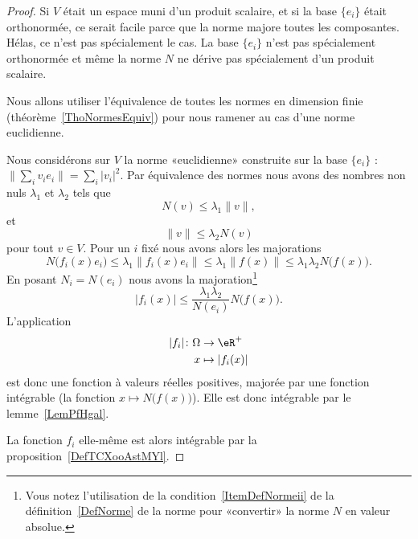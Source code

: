 \begin{proof}
	Si \( V\) était un espace muni d'un produit scalaire, et si la base \( \{ e_i \}\) était orthonormée, ce serait facile parce que la norme majore toutes les composantes. Hélas, ce n'est pas spécialement le cas. La base \( \{ e_i \}\) n'est pas spécialement orthonormée et même la norme \( N\) ne dérive pas spécialement d'un produit scalaire.

	Nous allons utiliser l'équivalence de toutes les normes en dimension finie (théorème~\ref{ThoNormesEquiv}) pour nous ramener au cas d'une norme euclidienne.

	Nous considérons sur \( V\) la norme «euclidienne» construite sur la base \( \{ e_i \}\) : \( \| \sum_iv_ie_i \|=\sum_i| v_i |^2\). Par équivalence des normes nous avons des nombres non nuls \( \lambda_1\) et \( \lambda_2\) tels que
	\begin{equation}
		N(v)\leq \lambda_1\| v \|,
	\end{equation}
	et
	\begin{equation}
		\| v \|\leq \lambda_2 N(v)
	\end{equation}
	pour tout \( v\in V\). Pour un \( i\) fixé nous avons alors les majorations
	\begin{equation}
		N\big( f_i(x)e_i \big)\leq \lambda_1\| f_i(x)e_i \|\leq \lambda_1\| f(x) \|\leq \lambda_1\lambda_2N\big( f(x) \big).
	\end{equation}
	En posant \( N_i=N(e_i)\) nous avons la majoration\footnote{Vous notez l'utilisation de la condition~\ref{ItemDefNormeii} de la définition~\ref{DefNorme} de la norme pour «convertir» la norme \( N\) en valeur absolue.}
	\begin{equation}
		| f_i(x) |\leq \frac{ \lambda_1\lambda_2 }{ N(e_i) }N\big( f(x) \big).
	\end{equation}
	L'application
	\begin{equation}
		\begin{aligned}
			| f_i |\colon \Omega & \to \eR^+          \\
			x                    & \mapsto | f_i(x) |
		\end{aligned}
	\end{equation}
	est donc une fonction à valeurs réelles positives, majorée par une fonction intégrable (la fonction \( x\mapsto N\big( f(x) \big)\)). Elle est donc intégrable par le lemme~\ref{LemPfHgal}.

	La fonction \( f_i\) elle-même est alors intégrable par la proposition~\ref{DefTCXooAstMYl}.
\end{proof}

